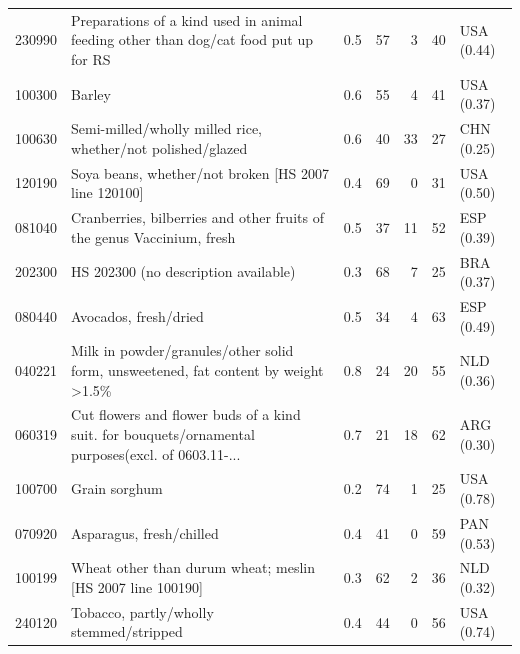 \begin{tabular}{@{}l p{6.4cm} r r r r l@{}}
230990 & Preparations of a kind used in animal feeding other than dog/\allowbreak{}cat food put up for RS & 0.5 & 57 & 3 & 40 & USA (0.44) \\
100300 & Barley & 0.6 & 55 & 4 & 41 & USA (0.37) \\
100630 & Semi-milled/\allowbreak{}wholly milled rice, whether/\allowbreak{}not polished/\allowbreak{}glazed & 0.6 & 40 & 33 & 27 & CHN (0.25) \\
120190 & Soya beans, whether/\allowbreak{}not broken [HS 2007 line 120100] & 0.4 & 69 & 0 & 31 & USA (0.50) \\
081040 & Cranberries, bilberries and other fruits of the genus Vaccinium, fresh & 0.5 & 37 & 11 & 52 & ESP (0.39) \\
202300 & HS 202300 (no description available) & 0.3 & 68 & 7 & 25 & BRA (0.37) \\
080440 & Avocados, fresh/\allowbreak{}dried & 0.5 & 34 & 4 & 63 & ESP (0.49) \\
040221 & Milk in powder/\allowbreak{}granules/\allowbreak{}other solid form, unsweetened, fat content by weight >1.5\% & 0.8 & 24 & 20 & 55 & NLD (0.36) \\
060319 & Cut flowers and flower buds of a kind suit. for bouquets/\allowbreak{}ornamental purposes(excl. of 0603.11-... & 0.7 & 21 & 18 & 62 & ARG (0.30) \\
100700 & Grain sorghum & 0.2 & 74 & 1 & 25 & USA (0.78) \\
070920 & Asparagus, fresh/\allowbreak{}chilled & 0.4 & 41 & 0 & 59 & PAN (0.53) \\
100199 & Wheat other than durum wheat; meslin [HS 2007 line 100190] & 0.3 & 62 & 2 & 36 & NLD (0.32) \\
240120 & Tobacco, partly/\allowbreak{}wholly stemmed/\allowbreak{}stripped & 0.4 & 44 & 0 & 56 & USA (0.74) \\
\bottomrule
\end{tabular}
